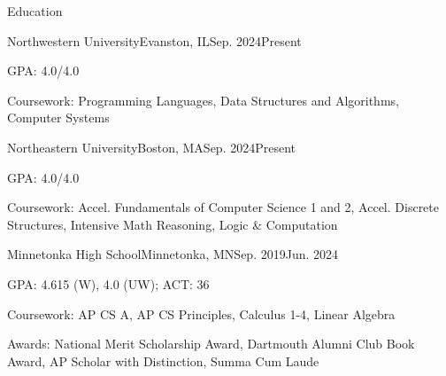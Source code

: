 \documentclass{resume} %
\begin{document}

\begin{rSection}{Education}
  \begin{rItem}{Northwestern University}{Evanston, IL}{Sep. 2024}{Present}
    \item GPA: 4.0/4.0
    \item Coursework: Programming Languages, Data Structures and Algorithms, Computer Systems
  \end{rItem}

  \begin{rItem}{Northeastern University}{Boston, MA}{Sep. 2024}{Present}
    \item GPA: 4.0/4.0
    \item Coursework: Accel. Fundamentals of Computer Science 1 and 2, Accel. Discrete Structures, Intensive Math Reasoning, Logic \& Computation
  \end{rItem}

  \begin{rItem}{Minnetonka High School}{Minnetonka, MN}{Sep. 2019}{Jun. 2024}
    \item GPA: 4.615 (W), 4.0 (UW); ACT: 36
    \item Coursework: AP CS A, AP CS Principles, Calculus 1-4, Linear Algebra
    \item Awards: National Merit Scholarship Award, Dartmouth Alumni Club Book Award, AP Scholar with Distinction, Summa Cum Laude
  \end{rItem}
\end{rSection}

\end{document}
